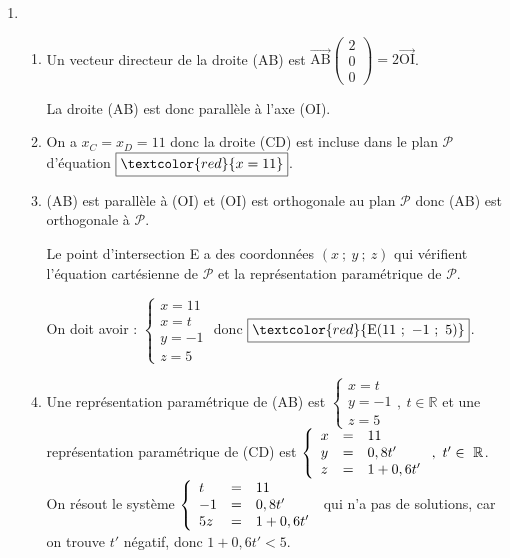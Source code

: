 \documentclass[12pt]{article}
\begin{document}
\begin{enumerate}
\item 
	\begin{enumerate}
		\item %
		Un vecteur directeur de la droite (AB) est $\overrightarrow{\text{AB}}\begin{pmatrix}2\\0\\0\end{pmatrix}=2\overrightarrow{\text{OI}}$.
		
		La droite (AB) est donc parallèle à l'axe (OI).
		
		\item %
				
On a $x_C=x_D=11$ donc la droite (CD) est incluse dans le plan $\mathcal{P}$ d'équation $\boxed{\textcolor{red}{x=11}}$.

		\item %
		(AB) est parallèle à (OI) et (OI) est orthogonale au plan $\mathcal{P}$ donc (AB) est orthogonale à $\mathcal{P}$.
		
		Le point d'intersection E a des coordonnées $(x~;~y~;~z) $ qui vérifient l'équation cartésienne de $\mathcal{P}$ et la représentation paramétrique de $\mathcal{P}$.
		
		On doit avoir : $\left\{\begin{array}{l}x=11\\x=t\\y=-1\\z=5\end{array}\right.$ donc $\boxed{\textcolor{red}{\text{E}(11~;~-1~;~5)}}$.
		
		\item %
		Une représentation paramétrique de (AB) est $\left\{\begin{array}{l}x=t\\y=-1\\z=5\end{array}\right.,~t\in\mathbb{R}$ et une représentation paramétrique de (CD) est $\left\{\begin{array}{l c l}x&=&11\\y&=&0,8t'\\z&=&1+0,6t'\end{array}\right.,~t'\in~\mathbb{R}$.
		On résout le système $\left\{\begin{array}{l c l}
t&=&11\\-1&=&0,8t'\\5z&=&1+0,6t'\end{array}\right.$ qui n'a pas de solutions, car on trouve $t'$ négatif, donc $1+0,6t'<5$.
		

\end{enumerate}
\end{enumerate}
\end{document}
